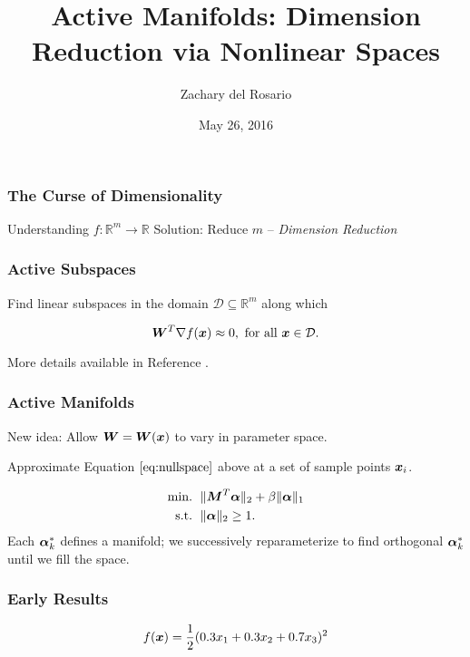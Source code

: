 \documentclass{beamer}
\title[Active Manifolds]{Active Manifolds: Dimension Reduction via Nonlinear Spaces} %
\author{Zachary del Rosario} %
\date{May 26, 2016} %
\begin{document}
\begin{frame}
\titlepage %
\end{frame}


\begin{frame}
\frametitle{The Curse of Dimensionality}
\centering
Understanding $f:\mathbb{R}^m\to\mathbb{R}$
Solution: Reduce $m$ -- \emph{Dimension Reduction}
\end{frame}


\begin{frame}
\frametitle{Active Subspaces}
Find linear subspaces in the domain $\mathcal{D}\subseteq\mathbb{R}^m$ along which 

\bigskip
\begin{equation}
\boldsymbol{W}^T\nabla f(\boldsymbol{x}) \approx 0, \text{ for all }\boldsymbol{x}\in \mathcal{D}.\label{eq:nullspace}
\end{equation}

\bigskip
More details available in Reference \cite{p1}.
\end{frame}


\begin{frame}
\frametitle{Active Manifolds}
New idea: Allow $\boldsymbol{W}=\boldsymbol{W}(\boldsymbol{x})$ to vary in parameter space.

\bigskip
Approximate Equation $\ref{eq:nullspace}$ above at a set of sample points $\boldsymbol{x}_i$.

\bigskip
\begin{equation}
\begin{aligned}
\text{min. }&\, \|\boldsymbol{M}^T\boldsymbol{\alpha}\|_2 + \beta\|\boldsymbol{\alpha}\|_1 \\
\text{s.t. }&\, \|\boldsymbol{\alpha}\|_2 \geq 1.
\end{aligned}
\end{equation}
Each $\boldsymbol{\alpha}^*_k$ defines a manifold; we successively reparameterize to find orthogonal $\boldsymbol{\alpha}^*_k$ until we fill the space.
\end{frame}


\begin{frame}
\frametitle{Early Results}
\[f(\boldsymbol{x}) = \frac{1}{2}(0.3x_1+0.3x_2+0.7x_3)^2\]
\end{frame}
\end{document}
